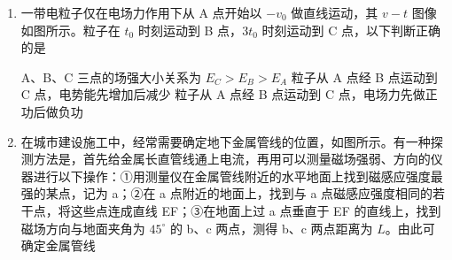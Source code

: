 \documentclass[\gkver]{gaokaozhenti}
\begin{document}
\begin{enumerate}

\fourchoices[answer=C]
{$13\Us$}
{$16\Us$}
{$21\Us$}
{$26\Us$}


\item
一带电粒子仅在电场力作用下从 A 点开始以 $-v_{0}$ 做直线运动，其 $v-t$ 图像如图所示。粒子在 $t_{0}$ 时刻运动到 B 点，$3t_{0}$ 时刻运动到 C 点，以下判断正确的是

\onepicture[w=4.20cm]{}

{A、B、C 三点的场强大小关系为 $E_{C}>E_{B}>E_{A}$}
{粒子从 A 点经 B 点运动到 C 点，电势能先增加后减少}
{粒子从 A 点经 B 点运动到 C 点，电场力先做正功后做负功}


\item
在城市建设施工中，经常需要确定地下金属管线的位置，如图所示。有一种探测方法是，首先给金属长直管线通上电流，再用可以测量磁场强弱、方向的仪器进行以下操作：①用测量仪在金属管线附近的水平地面上找到磁感应强度最强的某点，记为 a；②在 a 点附近的地面上，找到与 a 点磁感应强度相同的若干点，将这些点连成直线 EF；③在地面上过 a 点垂直于 EF 的直线上，找到磁场方向与地面夹角为 $45^\circ$ 的 b、c 两点，测得 b、c 两点距离为 $L$。由此可确定金属管线

\onepicture[w=3.72cm]{}


\end{enumerate}
\end{document}
